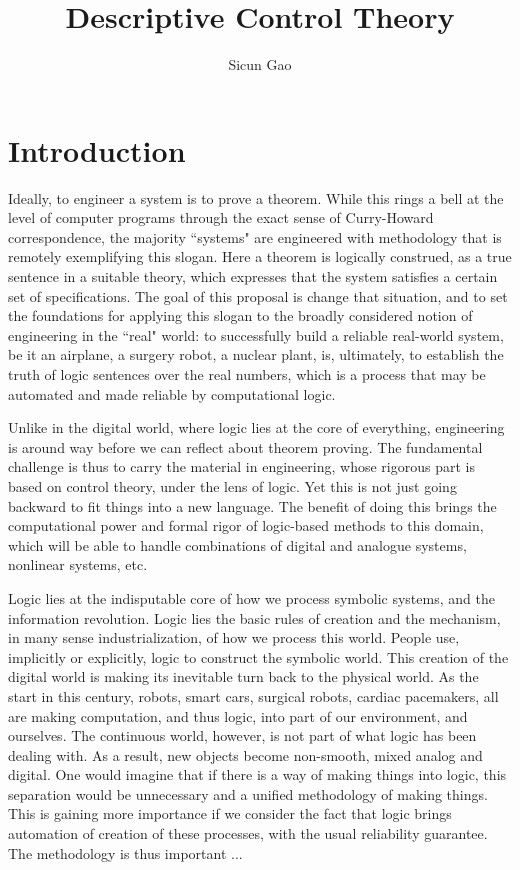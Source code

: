 \documentclass[10pt]{article}
\title{Descriptive Control Theory}
\author{Sicun Gao}
\date{}
\theoremstyle{definition}
\begin{document}
\maketitle
\thispagestyle{empty}

\section{Introduction}

Ideally, to engineer a system is to prove a theorem. While this rings a bell at the level of computer programs through the exact sense of Curry-Howard correspondence, the majority ``systems" are engineered with methodology that is remotely exemplifying this slogan. Here a theorem is logically construed, as a true sentence in a suitable theory, which expresses that the system satisfies a certain set of specifications. The goal of this proposal is change that situation, and to set the foundations for applying this slogan to the broadly considered notion of engineering in the ``real" world: to successfully build a reliable real-world system, be it an airplane, a surgery robot, a nuclear plant, is, ultimately, to establish the truth of logic sentences over the real numbers, which is a process that may be automated and made reliable by computational logic. 

Unlike in the digital world, where logic lies at the core of everything, engineering is around way before we can reflect about theorem proving. The fundamental challenge is thus to carry the material in engineering, whose rigorous part is based on control theory, under the lens of logic. Yet this is not just going backward to fit things into a new language. The benefit of doing this brings the computational power and formal rigor of logic-based methods to this domain, which will be able to handle combinations of digital and analogue systems, nonlinear systems, etc. 

Logic lies at the indisputable core of how we process symbolic systems, and the information revolution. Logic lies the basic rules of creation and the mechanism, in many sense industrialization, of how we process this world. People use, implicitly or explicitly, logic to construct the symbolic world. This creation of the digital world is making its inevitable turn back to the physical world. As the start in this century, robots, smart cars, surgical robots, cardiac pacemakers, all are making computation, and thus logic, into part of our environment, and ourselves. The continuous world, however, is not part of what logic has been dealing with. As a result, new objects become non-smooth, mixed analog and digital. One would imagine that if there is a way of making things into logic, this separation would be unnecessary and a unified methodology of making things. This is gaining more importance if we consider the fact that logic brings automation of creation of these processes, with the usual reliability guarantee. The methodology is thus important ...
\end{document}
